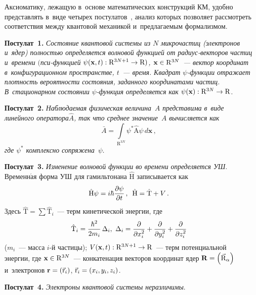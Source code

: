 \begin{multicols}{2}
    Аксиоматику, лежащую в~основе математических конструкций КМ, 
удобно представлять в~виде четырех постулатов~\cite{2-tor}, анализ которых 
позволяет рассмотреть соответствия между квантовой механикой и~предлагаемым формализмом.

\smallskip

\noindent
\textbf{Постулат~1.} \textit{Состояние квантовой системы из $N$ 
микрочастиц (электронов и~ядер) полностью определяется волновой функцией 
от ра\-ди\-ус-век\-то\-ров час\-тиц и~времени $($пси-функ\-ци\-ей 
$\psi(\mathbf{x},t): \mathrm{R}^{3N+1}\hm\to \mathrm{R})$, $\mathbf{x}\hm\in 
\mathrm{R}^{3N}$~--- \textit{вектор координат в~конфигурационном 
пространстве, $t$~--- время}. Квадрат $\psi$-функ\-ции отражает плот\-ность 
вероятности состояния, заданного координатами час\-тиц. В~стационарном 
состоянии $\psi$-функ\-ция определяется как} $\psi(\mathbf{x}): 
\mathrm{R}^{3N}\hm\to \mathrm{R}$.

\smallskip

\noindent
\textbf{Постулат~2.} \textit{Наблюдаемая физическая величина~$A$ 
представима в~виде линейного оператора$\hat{A}$, так что среднее 
значение~$A$ вычисляется как 
$$
\bar{A}=\int\limits_{\mathrm{R}^{3N}} \psi^* \hat{\mathrm{A}} \psi\,d\mathbf{x}\,,
$$ где $\psi^*$  комплексно сопряжена~$\psi$}.

\smallskip

\noindent
\textbf{Постулат~3.} \textit{Изменение волновой функции во времени 
определяется УШ}. Временн$\acute{\mbox{а}}$я 
форма УШ для гамильтонана $\hat{\mathrm{H}}$ записывается как
\begin{equation*}
\hat{\mathrm{H}}\psi= i \hbar\displaystyle\frac{\displaystyle \partial \psi\mathstrut}{\displaystyle \partial t\mathstrut}\,,\enskip 
\hat{\mathrm{H}}=\hat{\mathrm{T}}+{V}\,.
\end{equation*}
Здесь $\hat{\mathrm{T}}=\sum \hat{\mathrm{T}}_i$~--- терм кинетической энергии, 
где 
$$
\hat{\mathrm{T}}_i= \displaystyle\frac{\displaystyle \hbar^2\mathstrut}{\displaystyle 2m_i\mathstrut}\,\Delta_i,\
\Delta_i= \displaystyle\frac{\displaystyle \partial\mathstrut}{\displaystyle \partial x_i^2\mathstrut}+ \displaystyle\frac{\displaystyle \partial\mathstrut}{\displaystyle \partial y_i^2\mathstrut}+ \displaystyle\frac{\displaystyle \partial\mathstrut}{\displaystyle \partial z_i^2\mathstrut}
$$
 ($m_i$~--- масса  
$i$-й частицы);  $V(\mathbf{x},t): \mathrm{R}^{3N+1}\hm\to \mathrm{R}$~--- 
терм потенциальной энергии, где $\mathbf{x}\hm\in \mathrm{R}^{3N}$~--- 
конкатенация векторов координат ядер $\mathbf{R}\hm= \left( 
\vec{\mathrm{R}}_\alpha\right)$ и~электронов $\mathbf{r}\hm= \left( 
\vec{\mathrm{r}}_i\right)$, $\vec{\mathrm{r}}_i\hm= \left(x_i, y_i, z_i\right)$.

\smallskip

\noindent
\textbf{Постулат~4.} \textit{Электроны квантовой системы неразличимы}.


\end{multicols}
